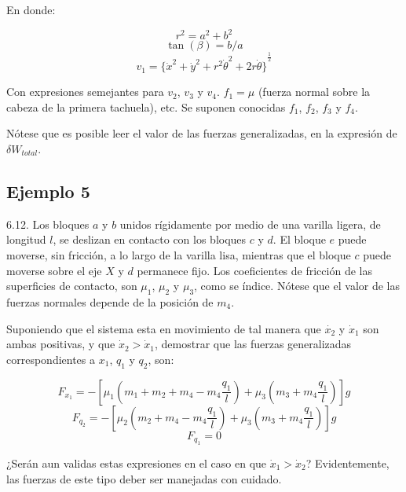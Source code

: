 En donde:

\begin{equation*}
    r^2=a^2+b^2
\end{equation*}
\begin{equation*}
    \tan(\beta)=b/a
\end{equation*}
\begin{equation*}
    v_1={\{\dot{x}^2+\dot{y}^2+r^2\dot{\theta}^2+2r\dot{\theta}\}}^{\frac{1}{2}}
\end{equation*}

Con expresiones semejantes para $v_2$, $v_3$ y $v_4$. $f_1=\mu$ (fuerza normal
sobre la cabeza de la primera tachuela), etc. Se suponen conocidas $f_1$, $f_2$,
$f_3$ y $f_4$.

Nótese que es posible leer el valor de las fuerzas generalizadas, en la
expresión de $\delta W_{total}$.

\subsection{Ejemplo 5}
6.12. Los bloques $a$ y $b$ unidos rígidamente por medio de una varilla ligera,
de longitud $l$, se deslizan en contacto con los bloques $c$ y $d$. El bloque
$e$ puede moverse, sin fricción, a lo largo de la varilla lisa, mientras que el
bloque $c$ puede moverse sobre el eje $X$ y $d$ permanece fijo. Los coeficientes
de fricción de las superficies de contacto, son $\mu_1$, $\mu_2$ y $\mu_3$, como
se índice. Nótese que el valor de las fuerzas normales depende de la posición de
$m_4$.

Suponiendo que el sistema esta en movimiento de tal manera que $\dot{x_2}$ y
$\dot{x}_1$ son ambas positivas, y que $\dot{x}_2>\dot{x}_1$, demostrar que las
fuerzas generalizadas correspondientes a $x_1$, $q_1$ y $q_2$, son:

\begin{equation*}
    F_{x_1}=-[\mu_1(m_1+m_2+m_4-m_4\frac{q_1}{l})+\mu_3(m_3+m_4\frac{q_1}{l})]g
\end{equation*}
\begin{equation*}
    F_{q_2}=-[\mu_2(m_2+m_4-m_4\frac{q_1}{l})+\mu_3(m_3+m_4\frac{q_1}{l})]g
\end{equation*}
\begin{equation*}
    F_{q_1}=0
\end{equation*}

¿Serán aun validas estas expresiones en el caso en que $\dot{x}_1>\dot{x}_2$?
Evidentemente, las fuerzas de este tipo deber ser manejadas con cuidado.

